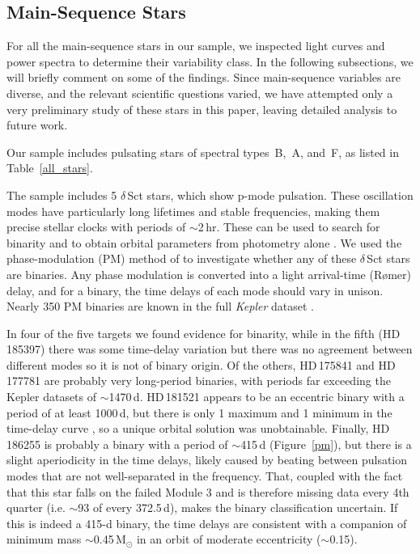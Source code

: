 \documentclass[modern]{aastex62}
\begin{document}
\subsection{Main-Sequence Stars}
\label{mainseq}

For all the main-sequence stars in our sample, we inspected light curves and power spectra to determine their variability class. In the following subsections, we will briefly comment on some of the findings. Since main-sequence variables are diverse, and the relevant scientific questions varied, we have attempted only a very preliminary study of these stars in this paper, leaving detailed analysis to future work.

Our sample includes pulsating stars of spectral types~B,~A, and~F, as listed in Table~\ref{all_stars}. 

The sample includes 5 $\delta$\,Sct stars, which show p-mode pulsation. These oscillation modes have particularly long lifetimes and stable frequencies, making them precise stellar clocks with periods of $\sim$2\,hr. These can be used to search for binarity and to obtain orbital parameters from photometry alone \citep{shibahashi&kurtz2012}. We used the phase-modulation (PM) method of \citet{murphyetal2014} to investigate whether any of these $\delta$\,Sct stars are binaries. Any phase modulation is converted into a light arrival-time (R\o mer) delay, and for a binary, the time delays of each mode should vary in unison. Nearly 350 PM binaries are known in the full \textit{Kepler} dataset \citep{murphyetal2018}.

In four of the five targets we found evidence for binarity, while in the fifth (HD\,185397) there was some time-delay variation but there was no agreement between different modes so it is not of binary origin. Of the others, HD\,175841 and HD\,177781 are probably very long-period binaries, with periods far exceeding the Kepler datasets of $\sim$1470\,d. HD\,181521 appears to be an eccentric binary with a period of at least 1000\,d, but there is only 1 maximum and 1 minimum in the time-delay curve \citep[cf.][]{murphy&shibahashi2015}, so a unique orbital solution was unobtainable. Finally, HD\,186255 is probably a binary with a period of $\sim$415\,d (Figure~\ref{pm}), but there is a slight aperiodicity in the time delays, likely caused by beating between pulsation modes that are not well-separated in the frequency. That, coupled with the fact that this star falls on the failed Module 3 and is therefore missing data every 4th quarter (i.e. $\sim$93 of every 372.5\,d), makes the binary classification uncertain. If this is indeed a 415-d binary, the time delays are consistent with a companion of minimum mass $\sim$0.45\,M$_{\odot}$ in an orbit of moderate eccentricity ($\sim$0.15).
\end{document}
